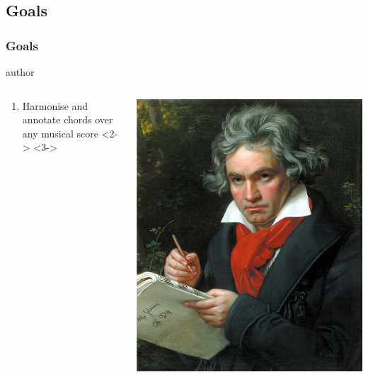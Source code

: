 \documentclass[english,fragile]{beamer}
\begin{document}
\subsection{Goals}
	\begin{frame}
		\frametitle{Goals}
			\begin{beamercolorbox}[leftskip=8cm,center,wd=0.7\textwidth]{author}
			\begin{columns}[T]
			\begin{column}{.60\textwidth}%
				\begin{enumerate}
					\item \alert{Harmonise} and annotate chords over any musical score
					<2->
					<3->
				\end{enumerate}
			\end{column}
			\begin{column}{.39\textwidth}%
			\includegraphics[width=\linewidth]{imagenes/Beethoven.jpg}
			\end{column}
			\end{columns}
			\end{beamercolorbox}
\end{frame}
\end{document}
